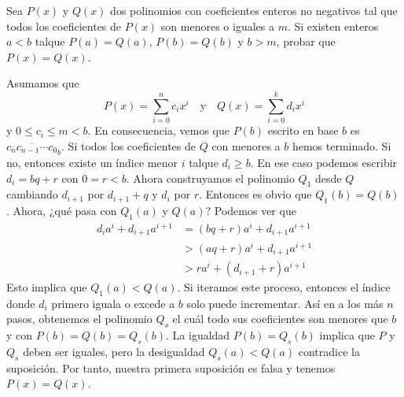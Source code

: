 \begin{example}
    Sea $P(x)$ y $Q(x)$ dos polinomios con coeficientes enteros no negativos tal que todos los coeficientes de $P(x)$ son menores o iguales a $m$.
    Si existen enteros $a < b$ talque $P(a) = Q(a)$, $P(b) = Q(b)$ y $b > m$, probar que $P(x) = Q(x)$.
\end{example}
\begin{solution}
    Asumamos que
    \[
        P(x) = \sum_{i = 0}^{n} c_i x^i \quad \text{y} \quad Q(x) = \sum_{i = 0}^{k} d_i x^i
    \]
    y $0 \leq c_i \leq m < b$.
    En consecuencia, vemos que $P(b)$ escrito en base $b$ es $\overline{c_n c_{n -1} \cdots c_0}_b$.
    Si todos los coeficientes de $Q$ con menores a $b$ hemos terminado.
    Si no, entonces existe un índice menor $i$ talque $d_i \geq b$.
    En ese caso podemos escribir $d_i = bq + r$ con $0 = r < b$.
    Ahora construyamos el polinomio $Q_1$ desde $Q$ cambiando $d_{i + 1}$ por $d_{i + 1} + q$ y $d_i$ por $r$.
    Entonces es obvio que $Q_1(b) = Q(b)$.
    Ahora, ¿qué pasa con $Q_1(a)$ y $Q(a)$?
    Podemos ver que
    \begin{align*}
        d_i a^i + d_{i + 1} a^{i + 1} &= (bq + r) a^i + d_{i + 1} a^{i + 1}\\
        &> (aq + r) a^i + d_{i + 1} a^{i + 1}\\
        &> r a^i + (d_{i + 1} + r) a^{i + 1}
    \end{align*}
    Esto implica que $Q_1(a) < Q(a)$.
    Si iteramos este proceso, entonces el índice donde $d_i$ primero iguala o excede a $b$ solo puede incrementar.
    Así en a los más $n$ pasos, obtenemos el polinomio $Q_s$ el cuál todo sus coeficientes son menores que $b$ y con $P(b) = Q(b) = Q_s(b)$.
    La igualdad $P(b) = Q_s(b)$ implica que $P$ y $Q_s$ deben ser iguales, pero la desigualdad $Q_s (a) < Q(a)$ contradice la suposición.
    Por tanto, nuestra primera suposición es falsa y tenemos $P(x) = Q(x)$.
\end{solution}

